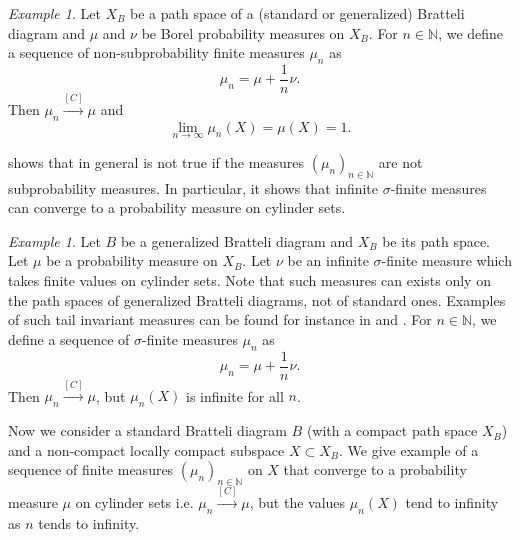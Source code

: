 \documentclass[11pt,reqno]{amsart}
\theoremstyle{definition}
\theoremstyle{remark}
\newtheorem{example}[definition]{Example}
\theoremstyle{plain}
\newcommand{\N}{\mathbb N}
\numberwithin{equation}{section}
\begin{document}
\begin{example}\label{Prop_general_conv_meas_fin}
Let $X_B$ be a path space of a (standard or generalized) Bratteli diagram and $\mu$ and $\nu$ be Borel probability measures on $X_B$. For $n \in \N$, we define a sequence of non-subprobability finite measures $\mu_n$ as
$$
\mu_n = \mu + \frac{1}{n} \nu.
$$ 
Then $\mu_n \xrightarrow{[C]} \mu$ and 
$$
\lim_{n \rightarrow \infty} \mu_n(X) = \mu(X) = 1.
$$
\end{example}
 shows that in general  is not true if the measures $(\mu_n)_{n \in \N}$ are not subprobability measures. In particular, it shows that infinite $\sigma$-finite measures can converge to a probability measure on cylinder sets. %
\begin{example}\label{Prop_general_conv_meas_inf}
Let $B$ be a generalized Bratteli diagram and $X_B$ be its path space.
Let $\mu$ be a probability measure on $X_B$.  
Let $\nu$ be an infinite $\sigma$-finite measure which takes finite values on cylinder sets. Note that such measures can exists only on the path spaces of generalized Bratteli diagrams, not of standard ones. Examples of such tail invariant measures can be found for instance in \cite[Proposition 7.10]{BezuglyiJorgensenKarpelSanadhya2025} and \cite[Theorem 5.5]{BezuglyiKarpelKwiatkowski2024}. For $n \in \N$, we define a sequence of $\sigma$-finite measures $\mu_n$ as
$$
\mu_n = \mu + \frac{1}{n} \nu.
$$
Then $\mu_n \xrightarrow{[C]} \mu$, but $\mu_n(X)$ is infinite for all $n$.
\end{example}
Now we consider a standard Bratteli diagram $B$ (with a compact path space $X_B$) and a non-compact locally compact subspace $X \subset X_B$. We give example of a sequence of finite measures $(\mu_n)_{n \in \N}$ on $X$ that converge to a probability measure $\mu$ on cylinder sets i.e. $\mu_n \xrightarrow{[C]} \mu$, but the values $\mu_n(X)$ tend to infinity as $n$ tends to infinity.
\end{document}
